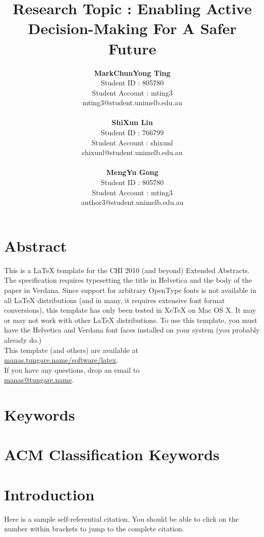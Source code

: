 \documentclass{chi-ext}
\title{Research Topic : Enabling Active Decision-Making For A Safer Future}
\author{
  \textbf{MarkChunYong Ting} \\
  Student ID : 805780 \\
  Student Account : mting3 \\
  mting3@student.unimelb.edu.au \\
  \\
  \textbf{ShiXun Liu} \\
  Student ID : 766799 \\
  Student Account : shixunl \\
  shixunl@student.unimelb.edu.au \\
  \\
  \textbf{MengYu Gong} \\
  Student ID : 805780 \\
  Student Account : mting3 \\
  author3@student.unimelb.edu.au \\
}
\begin{document}
\maketitle

\begin{multicols}{2}
  
\makeauthors
\makecopyright

\section{Abstract}

This is a LaTeX template for the CHI 2010 (and beyond) Extended Abstracts. The specification
requires typesetting the title in Helvetica and the body of the paper in Verdana. Since support for
arbitrary OpenType fonts is not available in all LaTeX distributions (and in many, it requires
extensive font format conversions), this template has only been tested in XeTeX on Mac OS X. It may
or may not work with other LaTeX distributions. To use this template, you must have the Helvetica
and Verdana font faces installed on your system (you probably already do.)
\\

This template (and others) are available at \\ \href{http://manas.tungare.name/software/latex}{manas.tungare.name/software/latex}.
\\

If you have any questions, drop an email to \\
\href{mailto:manas@tungare.name}{manas@tungare.name}.

\section{Keywords}
\makeatletter \@keywords \makeatother

\section{ACM Classification Keywords}
\makeatletter \@acmclassification \makeatother


\section{Introduction}

Here \cite{chi_extended_template} is a sample self-referential citation. You should be able to click
on the number within brackets to jump to the complete citation.


\end{multicols}
\end{document}
